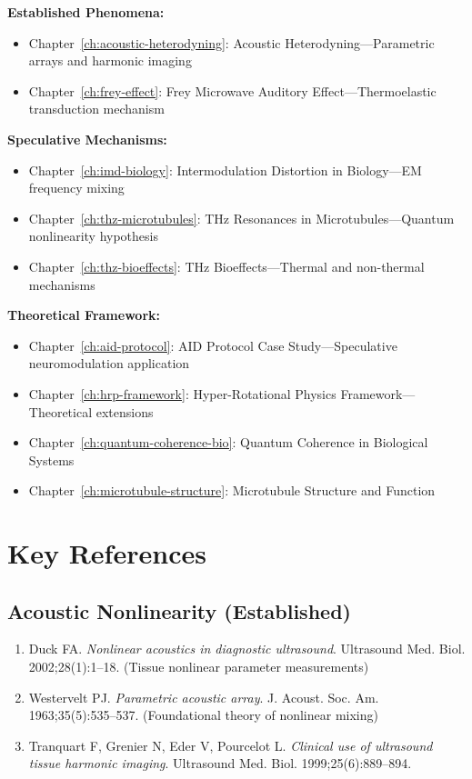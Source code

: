 \textbf{Established Phenomena:}
\begin{itemize}
\item Chapter~\ref{ch:acoustic-heterodyning}: Acoustic Heterodyning---Parametric arrays and harmonic imaging
\item Chapter~\ref{ch:frey-effect}: Frey Microwave Auditory Effect---Thermoelastic transduction mechanism
\end{itemize}

\textbf{Speculative Mechanisms:}
\begin{itemize}
\item Chapter~\ref{ch:imd-biology}: Intermodulation Distortion in Biology---EM frequency mixing
\item Chapter~\ref{ch:thz-microtubules}: THz Resonances in Microtubules---Quantum nonlinearity hypothesis
\item Chapter~\ref{ch:thz-bioeffects}: THz Bioeffects---Thermal and non-thermal mechanisms
\end{itemize}

\textbf{Theoretical Framework:}
\begin{itemize}
\item Chapter~\ref{ch:aid-protocol}: AID Protocol Case Study---Speculative neuromodulation application
\item Chapter~\ref{ch:hrp-framework}: Hyper-Rotational Physics Framework---Theoretical extensions
\item Chapter~\ref{ch:quantum-coherence-bio}: Quantum Coherence in Biological Systems
\item Chapter~\ref{ch:microtubule-structure}: Microtubule Structure and Function
\end{itemize}

\section{Key References}

\subsection*{Acoustic Nonlinearity (Established)}

\begin{enumerate}
\item Duck FA. \textit{Nonlinear acoustics in diagnostic ultrasound}. Ultrasound Med. Biol. 2002;28(1):1--18. (Tissue nonlinear parameter measurements)

\item Westervelt PJ. \textit{Parametric acoustic array}. J. Acoust. Soc. Am. 1963;35(5):535--537. (Foundational theory of nonlinear mixing)

\item Tranquart F, Grenier N, Eder V, Pourcelot L. \textit{Clinical use of ultrasound tissue harmonic imaging}. Ultrasound Med. Biol. 1999;25(6):889--894.
\end{enumerate}

